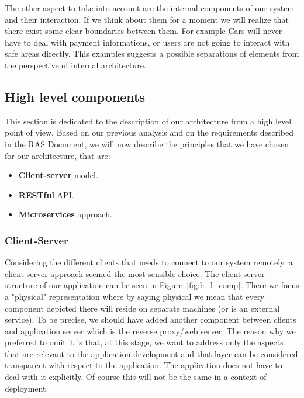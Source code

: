 The other aspect to take into account are the internal components of our system
and their interaction. If we think about them for a moment we will realize that
there exist some clear boundaries between them. For example Cars will never have
to deal with payment informations, or users are not going to interact with safe areas directly.
This examples suggests a possible separations of elements from the perspective
of internal architecture.

\subsection{High level components}
This section is dedicated to the description of our architecture from a high level
point of view. Based on our previous analysis and on the requirements described
in the RAS Document, we will now describe the principles that we have chosen for our
architecture, that are: 
\begin{itemize}
    \item \textbf{Client-server} model.
    \item \textbf{RESTful} API.
    \item \textbf{Microservices} approach.
\end{itemize}

\subsubsection{Client-Server}
Considering the different clients that needs to connect to our system remotely,
a client-server approach seemed the most sensible choice.
The client-server structure of our application can be seen in Figure~\ref{fig:h_l_comp}.
There we focus a "physical" representation where by saying physical we mean that
every component depicted there will reside on separate machines (or is an external service).
To be precise, we should have added another component between clients and
application server which is the reverse proxy/web server. The reason why we preferred to
omit it is that, at this stage, we want to address only the aspects that are relevant to the
application development and that layer can be considered transparent with respect to the application.
The application does not have to deal with it explicitly.
Of course this will not be the same in a context of deployment.

